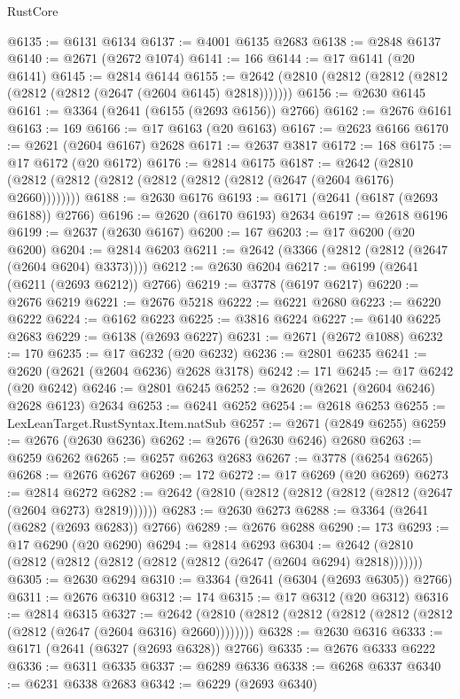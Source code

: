 \begin{lexlean}{RustCore}
\begin{coremodule}
@6135 := @6131 @6134
@6137 := @4001 @6135 @2683
@6138 := @2848 @6137
@6140 := @2671 (@2672 @1074)
@6141 := 166
@6144 := @17 @6141 (@20 @6141)
@6145 := @2814 @6144
@6155 := @2642 (@2810 (@2812 (@2812 (@2812 (@2812 (@2812 (@2647 (@2604 @6145) @2818)))))))
@6156 := @2630 @6145
@6161 := @3364 (@2641 (@6155 (@2693 @6156)) @2766)
@6162 := @2676 @6161
@6163 := 169
@6166 := @17 @6163 (@20 @6163)
@6167 := @2623 @6166
@6170 := @2621 (@2604 @6167) @2628
@6171 := @2637 @3817
@6172 := 168
@6175 := @17 @6172 (@20 @6172)
@6176 := @2814 @6175
@6187 := @2642 (@2810 (@2812 (@2812 (@2812 (@2812 (@2812 (@2812 (@2647 (@2604 @6176) @2660))))))))
@6188 := @2630 @6176
@6193 := @6171 (@2641 (@6187 (@2693 @6188)) @2766)
@6196 := @2620 (@6170 @6193) @2634
@6197 := @2618 @6196
@6199 := @2637 (@2630 @6167)
@6200 := 167
@6203 := @17 @6200 (@20 @6200)
@6204 := @2814 @6203
@6211 := @2642 (@3366 (@2812 (@2812 (@2647 (@2604 @6204) @3373))))
@6212 := @2630 @6204
@6217 := @6199 (@2641 (@6211 (@2693 @6212)) @2766)
@6219 := @3778 (@6197 @6217)
@6220 := @2676 @6219
@6221 := @2676 @5218
@6222 := @6221 @2680
@6223 := @6220 @6222
@6224 := @6162 @6223
@6225 := @3816 @6224
@6227 := @6140 @6225 @2683
@6229 := @6138 (@2693 @6227)
@6231 := @2671 (@2672 @1088)
@6232 := 170
@6235 := @17 @6232 (@20 @6232)
@6236 := @2801 @6235
@6241 := @2620 (@2621 (@2604 @6236) @2628 @3178)
@6242 := 171
@6245 := @17 @6242 (@20 @6242)
@6246 := @2801 @6245
@6252 := @2620 (@2621 (@2604 @6246) @2628 @6123) @2634
@6253 := @6241 @6252
@6254 := @2618 @6253
@6255 := LexLeanTarget.RustSyntax.Item.natSub
@6257 := @2671 (@2849 @6255)
@6259 := @2676 (@2630 @6236)
@6262 := @2676 (@2630 @6246) @2680
@6263 := @6259 @6262
@6265 := @6257 @6263 @2683
@6267 := @3778 (@6254 @6265)
@6268 := @2676 @6267
@6269 := 172
@6272 := @17 @6269 (@20 @6269)
@6273 := @2814 @6272
@6282 := @2642 (@2810 (@2812 (@2812 (@2812 (@2812 (@2647 (@2604 @6273) @2819))))))
@6283 := @2630 @6273
@6288 := @3364 (@2641 (@6282 (@2693 @6283)) @2766)
@6289 := @2676 @6288
@6290 := 173
@6293 := @17 @6290 (@20 @6290)
@6294 := @2814 @6293
@6304 := @2642 (@2810 (@2812 (@2812 (@2812 (@2812 (@2812 (@2647 (@2604 @6294) @2818)))))))
@6305 := @2630 @6294
@6310 := @3364 (@2641 (@6304 (@2693 @6305)) @2766)
@6311 := @2676 @6310
@6312 := 174
@6315 := @17 @6312 (@20 @6312)
@6316 := @2814 @6315
@6327 := @2642 (@2810 (@2812 (@2812 (@2812 (@2812 (@2812 (@2812 (@2647 (@2604 @6316) @2660))))))))
@6328 := @2630 @6316
@6333 := @6171 (@2641 (@6327 (@2693 @6328)) @2766)
@6335 := @2676 @6333 @6222
@6336 := @6311 @6335
@6337 := @6289 @6336
@6338 := @6268 @6337
@6340 := @6231 @6338 @2683
@6342 := @6229 (@2693 @6340)

\end{coremodule}
\end{lexlean}

